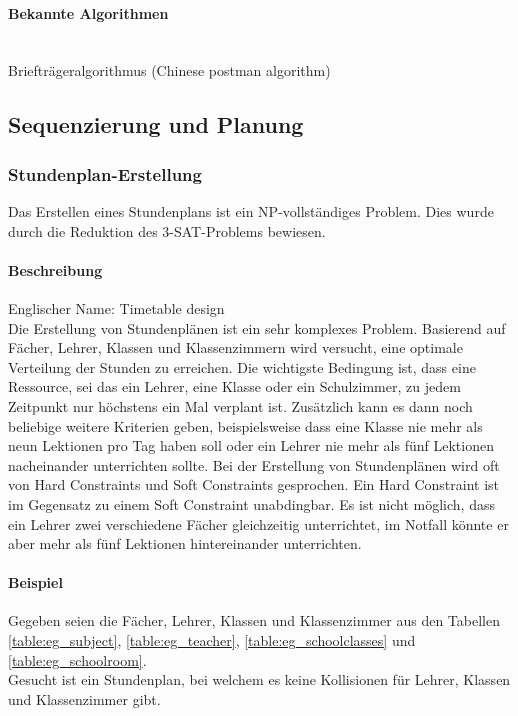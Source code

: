 	\paragraph{Bekannte Algorithmen}\mbox{}\\
	Briefträgeralgorithmus (Chinese postman algorithm)

\subsection{Sequenzierung und Planung}\label{sequencing_scheduling}

	\subsubsection{Stundenplan-Erstellung}\label{tsp}
	Das Erstellen eines Stundenplans ist ein NP-vollständiges Problem. Dies wurde durch die Reduktion des 3-SAT-Problems bewiesen.

	\paragraph{Beschreibung}
	Englischer Name: Timetable design\\
	Die Erstellung von Stundenplänen ist ein sehr komplexes Problem. Basierend auf Fächer, Lehrer, Klassen und Klassenzimmern wird versucht, eine optimale Verteilung der Stunden zu 
	erreichen. Die wichtigste Bedingung ist, dass eine Ressource, sei das ein Lehrer, eine Klasse oder ein Schulzimmer, zu jedem Zeitpunkt nur höchstens ein Mal verplant ist. 
	Zusätzlich kann es dann noch beliebige weitere Kriterien geben, beispielsweise dass eine Klasse nie mehr als neun Lektionen pro Tag haben soll oder ein Lehrer nie mehr als 
	fünf Lektionen nacheinander unterrichten sollte. Bei der Erstellung von Stundenplänen wird oft von Hard Constraints und Soft Constraints gesprochen. Ein Hard Constraint ist im Gegensatz zu 
	einem Soft Constraint unabdingbar. Es ist nicht möglich, dass ein Lehrer zwei verschiedene Fächer gleichzeitig unterrichtet, im Notfall könnte er aber mehr als fünf Lektionen hintereinander 
	unterrichten. \cite{Abramson92aparallel} \cite{Abramson91constructingschool} \cite{framework_timetabling} \cite{time_table_constraint_opti_ea}

	\paragraph{Beispiel} Gegeben seien die Fächer, Lehrer, Klassen und Klassenzimmer aus den Tabellen \ref{table:eg_subject}, \ref{table:eg_teacher}, \ref{table:eg_schoolclasses} und \ref{table:eg_schoolroom}.\\
Gesucht ist ein Stundenplan, bei welchem es keine Kollisionen für Lehrer, Klassen und Klassenzimmer gibt.

